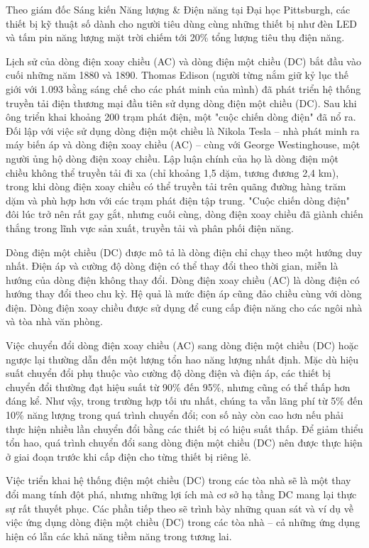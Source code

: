 \documentclass{thesis}
\begin{document}
Theo giám đốc Sáng kiến Năng lượng \& Điện năng tại Đại học
Pittsburgh, các thiết bị kỹ thuật số dành cho người tiêu dùng cùng
những thiết bị như đèn LED và tấm pin năng lượng mặt trời chiếm tới
20\% tổng lượng tiêu thụ điện năng.

Lịch sử của dòng điện xoay chiều (AC) và dòng điện một chiều (DC) bắt
đầu vào cuối những năm 1880 và 1890. Thomas Edison (người từng nắm
  giữ kỷ lục thế giới với 1.093 bằng sáng chế cho các phát minh của
mình) đã phát triển hệ thống truyền tải điện thương mại đầu tiên sử
dụng dòng điện một chiều (DC). Sau khi ông triển khai khoảng 200 trạm
phát điện, một "cuộc chiến dòng điện" đã nổ ra. Đối lập với việc sử
dụng dòng điện một chiều là Nikola Tesla – nhà phát minh ra máy biến
áp và dòng điện xoay chiều (AC) – cùng với George Westinghouse, một
người ủng hộ dòng điện xoay chiều. Lập luận chính của họ là dòng điện
một chiều không thể truyền tải đi xa (chỉ khoảng 1,5 dặm, tương đương
2,4 km), trong khi dòng điện xoay chiều có thể truyền tải trên quãng
đường hàng trăm dặm và phù hợp hơn với các trạm phát điện tập trung.
"Cuộc chiến dòng điện" đôi lúc trở nên rất gay gắt, nhưng cuối cùng,
dòng điện xoay chiều đã giành chiến thắng trong lĩnh vực sản xuất,
truyền tải và phân phối điện năng.

Dòng điện một chiều (DC) được mô tả là dòng điện chỉ chạy theo một
hướng duy nhất. Điện áp và cường độ dòng điện có thể thay đổi theo
thời gian, miễn là hướng của dòng điện không thay đổi. Dòng điện xoay
chiều (AC) là dòng điện có hướng thay đổi theo chu kỳ. Hệ quả là mức
điện áp cũng đảo chiều cùng với dòng điện. Dòng điện xoay chiều được
sử dụng để cung cấp điện năng cho các ngôi nhà và tòa nhà văn phòng.

Việc chuyển đổi dòng điện xoay chiều (AC) sang dòng điện một chiều
(DC) hoặc ngược lại thường dẫn đến một lượng tổn hao năng lượng nhất
định. Mặc dù hiệu suất chuyển đổi phụ thuộc vào cường độ dòng điện và
điện áp, các thiết bị chuyển đổi thường đạt hiệu suất từ 90\% đến
95\%, nhưng cũng có thể thấp hơn đáng kể. Như vậy, trong trường hợp
tối ưu nhất, chúng ta vẫn lãng phí từ 5\% đến 10\% năng lượng trong
quá trình chuyển đổi; con số này còn cao hơn nếu phải thực hiện nhiều
lần chuyển đổi bằng các thiết bị có hiệu suất thấp. Để giảm thiểu tổn
hao, quá trình chuyển đổi sang dòng điện một chiều (DC) nên được thực
hiện ở giai đoạn trước khi cấp điện cho từng thiết bị riêng lẻ.

Việc triển khai hệ thống điện một chiều (DC) trong các tòa nhà sẽ là
một thay đổi mang tính đột phá, nhưng những lợi ích mà cơ sở hạ tầng
DC mang lại thực sự rất thuyết phục. Các phần tiếp theo sẽ trình bày
những quan sát và ví dụ về việc ứng dụng dòng điện một chiều (DC)
trong các tòa nhà – cả những ứng dụng hiện có lẫn các khả năng tiềm
năng trong tương lai.
\end{document}
